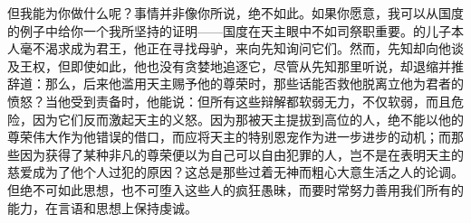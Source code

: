 但我能为你做什么呢？事情并非像你所说，绝不如此。如果你愿意，我可以从国度的例子中给你一个我所坚持的证明——国度在天主眼中不如司祭职重要。的儿子本人毫不渴求成为君王，他正在寻找母驴，来向先知询问它们。然而，先知却向他谈及王权，但即使如此，他也没有贪婪地追逐它，尽管从先知那里听说，却退缩并推辞道：那么，后来他滥用天主赐予他的尊荣时，那些话能否救他脱离立他为君者的愤怒？当他受到责备时，他能说：但所有这些辩解都软弱无力，不仅软弱，而且危险，因为它们反而激起天主的义怒。因为那被天主提拔到高位的人，绝不能以他的尊荣伟大作为他错误的借口，而应将天主的特别恩宠作为进一步进步的动机；而那些因为获得了某种非凡的尊荣便以为自己可以自由犯罪的人，岂不是在表明天主的慈爱成为了他个人过犯的原因？这总是那些过着无神而粗心大意生活之人的论调。但绝不可如此思想，也不可堕入这些人的疯狂愚昧，而要时常努力善用我们所有的能力，在言语和思想上保持虔诚。\par

